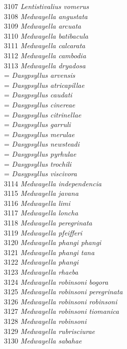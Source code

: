 \documentclass[
]{article}
\begin{document}
3107 \emph{Lentistivalius vomerus}\\
3108 \emph{Medwayella angustata}\\
3109 \emph{Medwayella arcuata}\\
3110 \emph{Medwayella batibacula}\\
3111 \emph{Medwayella calcarata}\\
3112 \emph{Medwayella cambodia}\\
3113 \emph{Medwayella dryadosa}\\
= \emph{Dasypsyllus arvensis}\\
= \emph{Dasypsyllus atricapillae}\\
= \emph{Dasypsyllus caudati}\\
= \emph{Dasypsyllus cinereae}\\
= \emph{Dasypsyllus citrinellae}\\
= \emph{Dasypsyllus garruli}\\
= \emph{Dasypsyllus merulae}\\
= \emph{Dasypsyllus newsteadi}\\
= \emph{Dasypsyllus pyrhulae}\\
= \emph{Dasypsyllus trochili}\\
= \emph{Dasypsyllus viscivora}\\
3114 \emph{Medwayella independencia}\\
3115 \emph{Medwayella javana}\\
3116 \emph{Medwayella limi}\\
3117 \emph{Medwayella loncha}\\
3118 \emph{Medwayella peregrinata}\\
3119 \emph{Medwayella pfeifferi}\\
3120 \emph{Medwayella phangi phangi}\\
3121 \emph{Medwayella phangi tana}\\
3122 \emph{Medwayella phangi}\\
3123 \emph{Medwayella rhaeba}\\
3124 \emph{Medwayella robinsoni bogora}\\
3125 \emph{Medwayella robinsoni peregrinata}\\
3126 \emph{Medwayella robinsoni robinsoni}\\
3127 \emph{Medwayella robinsoni tiomanica}\\
3128 \emph{Medwayella robinsoni}\\
3129 \emph{Medwayella rubrisciurae}\\
3130 \emph{Medwayella sabahae}\\
\end{document}
